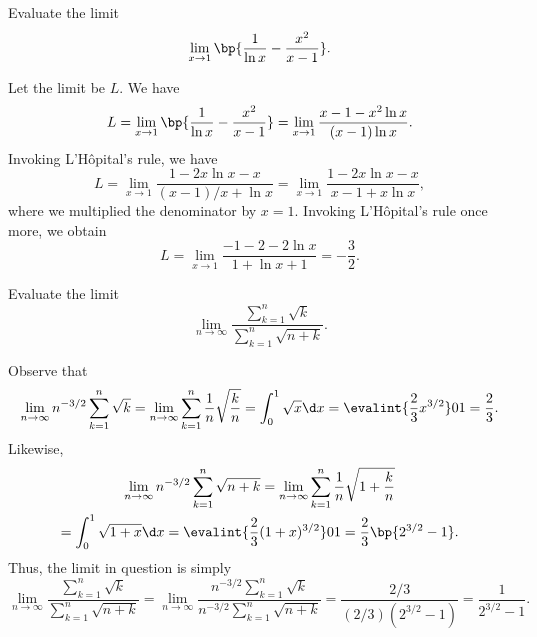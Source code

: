\begin{problem}
    Evaluate the limit \[\lim_{x \to 1} \bp{\frac{1}{\ln x} - \frac{x^2}{x - 1}}.\]
\end{problem}
\begin{solution}
    Let the limit be $L$. We have \[L = \lim_{x \to 1} \bp{\frac{1}{\ln x} - \frac{x^2}{x - 1}} = \lim_{x \to 1} \frac{x - 1 - x^2 \ln x}{(x-1)\ln x}.\] Invoking L'H\^{o}pital's rule, we have \[L = \lim_{x \to 1} \frac{1 - 2x \ln x - x}{(x-1)/x + \ln x} = \lim_{x \to 1} \frac{1 - 2x \ln x - x}{x - 1 + x \ln x},\] where we multiplied the denominator by $x = 1$. Invoking L'H\^{o}pital's rule once more, we obtain \[L = \lim_{x \to 1} \frac{-1 -2 - 2\ln x}{1 + \ln x + 1} = -\frac32.\]
\end{solution}

\begin{problem}
    Evaluate the limit \[\lim_{n \to \infty} \frac{\sum_{k = 1}^n \sqrt{k}}{\sum_{k = 1}^n \sqrt{n + k}}.\]
\end{problem}
\begin{solution}
    Observe that \[\lim_{n \to \infty} n^{-3/2} \sum_{k = 1}^n \sqrt{k} = \lim_{n \to \infty} \sum_{k = 1}^n \frac1n \sqrt{\frac{k}{n}} = \int_0^1 \sqrt{x} \d x = \evalint{\frac23 x^{3/2}}01 = \frac23.\] Likewise,
    \begin{gather*}
        \lim_{n \to \infty} n^{-3/2} \sum_{k = 1}^n \sqrt{n + k} = \lim_{n \to \infty} \sum_{k = 1}^n \frac1n \sqrt{1 + \frac{k}{n}}\\
        = \int_0^1 \sqrt{1 + x} \d x = \evalint{\frac23 (1+x)^{3/2}}01 = \frac23 \bp{2^{3/2} - 1}.
    \end{gather*}
    Thus, the limit in question is simply \[\lim_{n \to \infty} \frac{\sum_{k = 1}^n \sqrt{k}}{\sum_{k = 1}^n \sqrt{n + k}} = \lim_{n \to \infty} \frac{n^{-3/2} \sum_{k = 1}^n \sqrt{k}}{n^{-3/2} \sum_{k = 1}^n \sqrt{n + k}} = \frac{2/3}{(2/3)(2^{3/2} - 1)} = \frac1{2^{3/2} - 1}.\]
\end{solution}